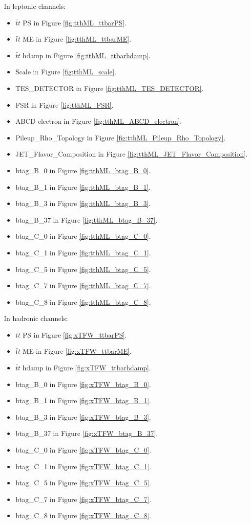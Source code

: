 In leptonic channels:
\begin{itemize}
	\item $\bar{t}t$ PS in Figure \ref{fig:tthML_ttbarPS}.
	\item $\bar{t}t$ ME in Figure \ref{fig:tthML_ttbarME}.
	\item $\bar{t}t$ hdamp in Figure \ref{fig:tthML_ttbarhdamp}.
	\item Scale in Figure \ref{fig:tthML_scale}.
	\item TES\_DETECTOR in Figure \ref{fig:tthML_TES_DETECTOR}.
	\item FSR in Figure \ref{fig:tthML_FSR}.
	\item ABCD electron in Figure \ref{fig:tthML_ABCD_electron}.
	\item Pileup\_Rho\_Topology in Figure \ref{fig:tthML_Pileup_Rho_Topology}.
	\item JET\_Flavor\_Composition in Figure \ref{fig:tthML_JET_Flavor_Composition}.
	\item btag\_B\_0 in Figure \ref{fig:tthML_btag_B_0}.
	\item btag\_B\_1 in Figure \ref{fig:tthML_btag_B_1}.
	\item btag\_B\_3 in Figure \ref{fig:tthML_btag_B_3}.
	\item btag\_B\_37 in Figure \ref{fig:tthML_btag_B_37}.
	\item btag\_C\_0 in Figure \ref{fig:tthML_btag_C_0}.
	\item btag\_C\_1 in Figure \ref{fig:tthML_btag_C_1}.
	\item btag\_C\_5 in Figure \ref{fig:tthML_btag_C_5}.
	\item btag\_C\_7 in Figure \ref{fig:tthML_btag_C_7}.
	\item btag\_C\_8 in Figure \ref{fig:tthML_btag_C_8}.

\end{itemize}

In hadronic channels:
\begin{itemize}
	\item $\bar{t}t$ PS in Figure \ref{fig:xTFW_ttbarPS}.
	\item $\bar{t}t$ ME in Figure \ref{fig:xTFW_ttbarME}.
	\item $\bar{t}t$ hdamp in Figure \ref{fig:xTFW_ttbarhdamp}.
	\item btag\_B\_0 in Figure \ref{fig:xTFW_btag_B_0}.
	\item btag\_B\_1 in Figure \ref{fig:xTFW_btag_B_1}.
	\item btag\_B\_3 in Figure \ref{fig:xTFW_btag_B_3}.
	\item btag\_B\_37 in Figure \ref{fig:xTFW_btag_B_37}.
	\item btag\_C\_0 in Figure \ref{fig:xTFW_btag_C_0}.
	\item btag\_C\_1 in Figure \ref{fig:xTFW_btag_C_1}.
	\item btag\_C\_5 in Figure \ref{fig:xTFW_btag_C_5}.
	\item btag\_C\_7 in Figure \ref{fig:xTFW_btag_C_7}.
	\item btag\_C\_8 in Figure \ref{fig:xTFW_btag_C_8}.
\end{itemize}

